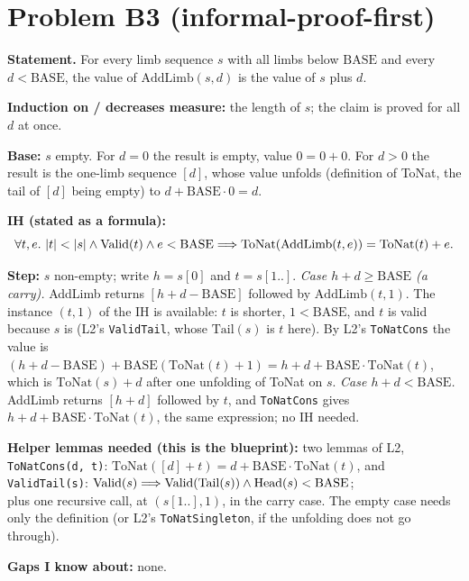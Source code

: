 \documentclass[11pt]{article}
\begin{document}
\section*{Problem B3 (informal-proof-first)}\label{ans:B3}
\begin{answer}
\textbf{Statement.} For every limb sequence $s$ with all limbs below
$\mathrm{BASE}$ and every $d < \mathrm{BASE}$, the value of
$\mathrm{AddLimb}(s, d)$ is the value of $s$ plus $d$.

\textbf{Induction on / decreases measure:} the length of $s$; the claim is
proved for all $d$ at once.

\textbf{Base:} $s$ empty. For $d = 0$ the result is empty, value $0 = 0 + 0$.
For $d > 0$ the result is the one-limb sequence $[d]$, whose value unfolds
(definition of ToNat, the tail of $[d]$ being empty) to
$d + \mathrm{BASE} \cdot 0 = d$.

\textbf{IH (stated as a formula):}
\[ \forall t, e.\ |t| < |s| \wedge \mathrm{Valid}(t) \wedge e < \mathrm{BASE} \Longrightarrow
\mathrm{ToNat}(\mathrm{AddLimb}(t, e)) = \mathrm{ToNat}(t) + e. \]

\textbf{Step:} $s$ non-empty; write $h = s[0]$ and $t = s[1..]$.
\emph{Case $h + d \geq \mathrm{BASE}$ (a carry).} AddLimb returns
$[h + d - \mathrm{BASE}]$ followed by $\mathrm{AddLimb}(t, 1)$. The
instance $(t, 1)$ of the IH is available: $t$ is shorter, $1 < \mathrm{BASE}$,
and $t$ is valid because $s$ is (L2's \texttt{ValidTail}, whose
$\mathrm{Tail}(s)$ is $t$ here). By L2's \texttt{ToNatCons} the value is
$(h + d - \mathrm{BASE}) + \mathrm{BASE}(\mathrm{ToNat}(t) + 1) = h + d +
\mathrm{BASE}\cdot\mathrm{ToNat}(t)$, which is $\mathrm{ToNat}(s) + d$ after one
unfolding of ToNat on $s$.
\emph{Case $h + d < \mathrm{BASE}$.} AddLimb returns $[h + d]$ followed by $t$,
and \texttt{ToNatCons} gives $h + d + \mathrm{BASE}\cdot\mathrm{ToNat}(t)$, the same
expression; no IH needed.

\textbf{Helper lemmas needed (this is the blueprint):} two lemmas of L2, \\
\texttt{ToNatCons(d, t)}: $\mathrm{ToNat}([d] + t) = d + \mathrm{BASE}\cdot\mathrm{ToNat}(t)$, and \\
\texttt{ValidTail(s)}: $\mathrm{Valid}(s) \Longrightarrow \mathrm{Valid}(\mathrm{Tail}(s)) \wedge \mathrm{Head}(s) < \mathrm{BASE}$; \\
plus one recursive call, at $(s[1..], 1)$, in the carry case. The empty case
needs only the definition (or L2's \texttt{ToNatSingleton}, if the unfolding
does not go through).

\textbf{Gaps I know about:} none.
\end{answer}
\end{document}
